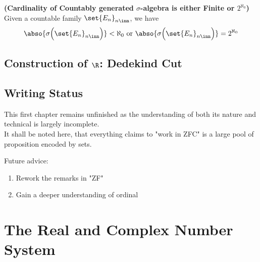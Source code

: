 \documentclass{report}
\begin{document}
\begin{theorem}
\label{0.7.19}
\textbf{(Cardinality of Countably generated $\sigma$-algebra is either Finite or $2^{\aleph_0}$)} Given a countable family $\set{E_n}_{n\inn}$, we have
\begin{align*}
  \abso{\sigma \Big(\set{E_n}_{n\inn} \Big)}<\aleph_0\text{ or }\abso{\sigma\Big(\set{E_n}_{n\inn} \Big)}=2^{\aleph_0}
\end{align*}
\end{theorem}
\section{Construction of $\R$: Dedekind Cut}
\section{Writing Status}
\begin{mdframed}
This first chapter remains unfinished as the understanding of both its nature and technical is largely incomplete.\\

It shall be noted here, that everything claims to "work in ZFC" is a large pool of proposition encoded by sets. 

Future advice: 

\begin{enumerate}[label=(\alph*)]
  \item Rework the remarks in "ZF" 
  \item Gain a deeper understanding of ordinal
\end{enumerate}



\end{mdframed}
\chapter{The Real and Complex Number System}
\end{document}

